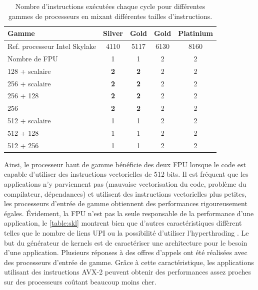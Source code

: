         
        \begin{table}[h!]
        \normalsize
        \caption{Nombre d'instructions exécutées chaque cycle pour différentes gammes de processeurs en mixant différentes tailles d'instructions.}
        \label{res:skl}
        \centering
        \begin{tabular}{|l|c|c|c|c|}
            \hline
            \rowcolor[HTML]{EFEFEF} 
            Gamme & Silver & Gold & Gold & Platinium \\ \hline
            \rowcolor[HTML]{EFEFEF} 
            Ref. processeur Intel Skylake & 4110 & 5117 & 6130 & 8160 \\ \hline
            \rowcolor[HTML]{EFEFEF} 
            Nombre de FPU & 1 & 1 & 2 & 2 \\ \hline
            128 + scalaire & \textbf{2} & \textbf{2} & 2 & 2 \\ \hline
            256 + scalaire & \textbf{2} & \textbf{2} & 2 & 2 \\ \hline
            256 + 128 & \textbf{2} & \textbf{2} & 2 & 2 \\ \hline
            256 & \textbf{2} & \textbf{2} & 2 & 2 \\ \hline
            512 + scalaire & 1 & 1 & 2 & 2 \\ \hline
            512 + 128 & 1 & 1 & 2 & 2 \\ \hline
            512 + 256 & 1 & 1 & 2 & 2 \\ \hline
        
        \end{tabular}
        \end{table}
        
        
        
       Ainsi, le processeur haut de gamme bénéficie des deux FPU lorsque le code est capable d'utiliser des instructions vectorielles de 512 bits. Il est fréquent que les applications n'y parviennent pas (mauvaise vectorisation du code, problème du compilateur, dépendances) et utilisent des instructions vectorielles plus petites, les processeurs d'entrée de gamme obtiennent des performances rigoureusement égales. Évidement, la FPU n'est pas la seule responsable de la performance d'une application, le \autoref{table:skl} montrent bien que d'autres caractéristiques diffèrent telles que le nombre de liens UPI ou la possibilité d'utiliser l'hyperthrading . Le but du générateur de kernels est de caractériser une architecture pour le besoin d'une application. Plusieurs réponses à des offres d'appels ont été réalisées avec des processeurs d'entrée de gamme. Grâce à cette caractéristique, les applications utilisant des instructions AVX-2 peuvent obtenir des performances assez proches sur des processeurs coûtant beaucoup moins cher.


